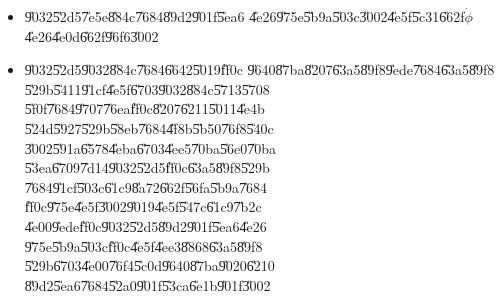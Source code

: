 \begin{itemize}
\item \U{9032}\U{52d5}\U{7e5e}\U{884c}\U{7684}\U{89d2}\U{901f}\U{5ea6}%
\U{4e26}\U{975e}\U{5b9a}\U{503c}\U{3002}\U{4e5f}\U{5c31}\U{662f}$\dot{\phi}$%
\U{4e26}\U{4e0d}\U{662f}\U{96f6}\U{3002}

\item \U{9032}\U{52d5}\U{9032}\U{884c}\U{7684}\U{6642}\U{5019}\U{ff0c}%
\U{9640}\U{87ba}\U{8207}\U{63a5}\U{89f8}\U{9ede}\U{7684}\U{63a5}\U{89f8}%
\U{529b}\U{5411}\U{91cf}\U{4e5f}\U{6703}\U{9032}\U{884c}\U{5713}\U{5708}%
\U{5f0f}\U{7684}\U{9707}\U{76ea}\U{ff0c}\U{8207}\U{6211}\U{5011}\U{4e4b}%
\U{524d}\U{5927}\U{529b}\U{58eb}\U{7684}\U{4f8b}\U{5b50}\U{76f8}\U{540c}%
\U{3002}\U{591a}\U{6578}\U{4eba}\U{6703}\U{4ee5}\U{70ba}\U{56e0}\U{70ba}%
\U{53ea}\U{6709}\U{7d14}\U{9032}\U{52d5}\U{ff0c}\U{63a5}\U{89f8}\U{529b}%
\U{7684}\U{91cf}\U{503c}\U{61c9}\U{8a72}\U{662f}\U{56fa}\U{5b9a}\U{7684}%
\U{ff0c}\U{975e}\U{4e5f}\U{3002}\U{9019}\U{4e5f}\U{547c}\U{61c9}\U{7b2c}%
\U{4e00}\U{9ede}\U{ff0c}\U{9032}\U{52d5}\U{89d2}\U{901f}\U{5ea6}\U{4e26}%
\U{975e}\U{5b9a}\U{503c}\U{ff0c}\U{4e5f}\U{4ee3}\U{8868}\U{63a5}\U{89f8}%
\U{529b}\U{6703}\U{4e00}\U{76f4}\U{5c0d}\U{9640}\U{87ba}\U{9020}\U{6210}%
\U{89d2}\U{5ea6}\U{7684}\U{52a0}\U{901f}\U{53ca}\U{6e1b}\U{901f}\U{3002}
\end{itemize}

